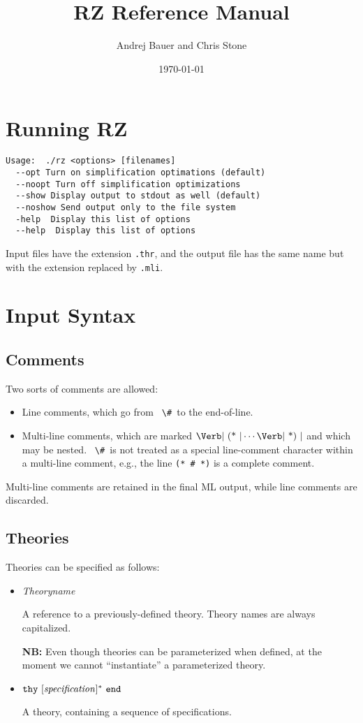 \documentclass[12pt]{article}
\title{RZ Reference Manual}
\date{\today}
\author{Andrej Bauer and Chris Stone}
\newcommand{\keywd}[1]{\mbox{\texttt{#1}}\xspace}
\newcommand{\END}{\keywd{end}}
\newcommand{\THY}{\keywd{thy}}
\newcommand{\metav}[1]{\mbox{\textit{#1}}\xspace}
\newcommand{\TIdentifier}{\metav{Theoryname}}
\newcommand{\Specification}{\metav{specification}}
\newcommand{\HASH}{\mbox{\Verb| \# |}}
\newcommand{\LCOMMENT}{\mbox{\Verb| (* |}}
\newcommand{\RCOMMENT}{\mbox{\Verb| *) |}}
\newcommand{\NB}{\textbf{NB: }}
\begin{document}
\maketitle

\section{Running RZ}

\begin{Verbatim}
Usage:  ./rz <options> [filenames]
  --opt Turn on simplification optimations (default)
  --noopt Turn off simplification optimizations
  --show Display output to stdout as well (default)
  --noshow Send output only to the file system
  -help  Display this list of options
  --help  Display this list of options
\end{Verbatim}

Input files have the extension \Verb|.thr|, and the 
output file has the same name but with the extension replaced by \Verb|.mli|.

\section{Input Syntax}

\subsection{Comments}

Two sorts of comments are allowed:
\begin{itemize}
\item Line comments, which go from \HASH to the end-of-line.
\item Multi-line comments, which are marked $\LCOMMENT \cdots
  \RCOMMENT$ and which may be nested.  \HASH is not treated as a
  special line-comment character within a multi-line comment, e.g.,
  the line \Verb|(* # *)| is a complete comment.
\end{itemize}

  Multi-line comments are retained in the final ML output, while line
  comments are discarded.

\subsection{Theories}

Theories can be specified as follows:
\begin{itemize}
\item \TIdentifier

   A reference to a previously-defined theory.  Theory names are always
   capitalized.
   
   \NB Even though theories can be parameterized when
     defined, at the moment we cannot ``instantiate'' a parameterized
     theory.

\item $\THY\ [\Specification]^*\ \END$

   A theory, containing a sequence of specifications.
\end{itemize}
\end{document}
